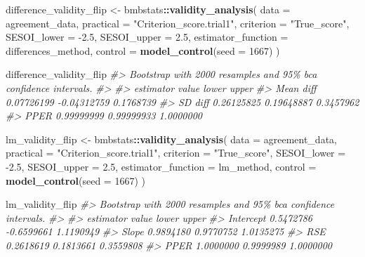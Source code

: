 \documentclass[
]{book}
\newenvironment{Shaded}{\begin{snugshade}}{\end{snugshade}}
\newcommand{\CommentTok}[1]{\textcolor[rgb]{0.56,0.35,0.01}{\textit{#1}}}
\newcommand{\DataTypeTok}[1]{\textcolor[rgb]{0.13,0.29,0.53}{#1}}
\newcommand{\DecValTok}[1]{\textcolor[rgb]{0.00,0.00,0.81}{#1}}
\newcommand{\FloatTok}[1]{\textcolor[rgb]{0.00,0.00,0.81}{#1}}
\newcommand{\KeywordTok}[1]{\textcolor[rgb]{0.13,0.29,0.53}{\textbf{#1}}}
\newcommand{\NormalTok}[1]{#1}
\newcommand{\OperatorTok}[1]{\textcolor[rgb]{0.81,0.36,0.00}{\textbf{#1}}}
\newcommand{\StringTok}[1]{\textcolor[rgb]{0.31,0.60,0.02}{#1}}
\begin{document}
\begin{Shaded}
\begin{Highlighting}[]
\NormalTok{difference\_validity\_flip <{-}}\StringTok{ }\NormalTok{bmbstats}\OperatorTok{::}\KeywordTok{validity\_analysis}\NormalTok{(}
  \DataTypeTok{data =}\NormalTok{ agreement\_data,}
  \DataTypeTok{practical =} \StringTok{"Criterion\_score.trial1"}\NormalTok{,}
  \DataTypeTok{criterion =} \StringTok{"True\_score"}\NormalTok{,}
  \DataTypeTok{SESOI\_lower =} \FloatTok{{-}2.5}\NormalTok{,}
  \DataTypeTok{SESOI\_upper =} \FloatTok{2.5}\NormalTok{,}
  \DataTypeTok{estimator\_function =}\NormalTok{ differences\_method,}
  \DataTypeTok{control =} \KeywordTok{model\_control}\NormalTok{(}\DataTypeTok{seed =} \DecValTok{1667}\NormalTok{)}
\NormalTok{)}

\NormalTok{difference\_validity\_flip}
\CommentTok{\#> Bootstrap with 2000 resamples and 95\% bca confidence intervals.}
\CommentTok{\#> }
\CommentTok{\#>  estimator      value       lower     upper}
\CommentTok{\#>  Mean diff 0.07726199 {-}0.04312759 0.1768739}
\CommentTok{\#>    SD diff 0.26125825  0.19648887 0.3457962}
\CommentTok{\#>       PPER 0.99999999  0.99999933 1.0000000}
\end{Highlighting}
\end{Shaded}

\begin{Shaded}
\begin{Highlighting}[]
\NormalTok{lm\_validity\_flip <{-}}\StringTok{ }\NormalTok{bmbstats}\OperatorTok{::}\KeywordTok{validity\_analysis}\NormalTok{(}
  \DataTypeTok{data =}\NormalTok{ agreement\_data,}
  \DataTypeTok{practical =} \StringTok{"Criterion\_score.trial1"}\NormalTok{,}
  \DataTypeTok{criterion =} \StringTok{"True\_score"}\NormalTok{,}
  \DataTypeTok{SESOI\_lower =} \FloatTok{{-}2.5}\NormalTok{,}
  \DataTypeTok{SESOI\_upper =} \FloatTok{2.5}\NormalTok{,}
  \DataTypeTok{estimator\_function =}\NormalTok{ lm\_method,}
  \DataTypeTok{control =} \KeywordTok{model\_control}\NormalTok{(}\DataTypeTok{seed =} \DecValTok{1667}\NormalTok{)}
\NormalTok{)}

\NormalTok{lm\_validity\_flip}
\CommentTok{\#> Bootstrap with 2000 resamples and 95\% bca confidence intervals.}
\CommentTok{\#> }
\CommentTok{\#>  estimator     value      lower     upper}
\CommentTok{\#>  Intercept 0.5472786 {-}0.6599661 1.1190949}
\CommentTok{\#>      Slope 0.9894180  0.9770752 1.0135275}
\CommentTok{\#>        RSE 0.2618619  0.1813661 0.3559808}
\CommentTok{\#>       PPER 1.0000000  0.9999989 1.0000000}
\end{Highlighting}
\end{Shaded}
\end{document}

